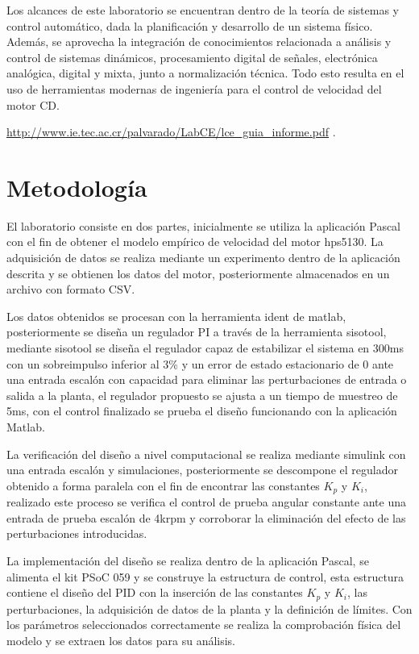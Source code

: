 \documentclass[conference]{IEEEtran}
\begin{document}
Los alcances de este laboratorio se encuentran dentro de la teoría de sistemas y control automático, dada la planificación y desarrollo de un sistema físico. Además, se aprovecha la integración de conocimientos relacionada a análisis y control de sistemas dinámicos, procesamiento digital de señales, electrónica analógica, digital y mixta, junto a normalización técnica. Todo esto resulta en el uso de herramientas modernas de ingeniería para el control de velocidad del motor CD.

\underline{\url{http://www.ie.tec.ac.cr/palvarado/LabCE/lce_guia_informe.pdf}} \cite{Pablo2018}.
\section{Metodología}

El laboratorio consiste en dos partes, inicialmente se utiliza la aplicación Pascal con el fin de obtener el modelo empírico de velocidad del motor hps5130. La adquisición de datos se realiza mediante un experimento dentro de la aplicación descrita y se obtienen los datos del motor, posteriormente almacenados en un archivo con formato CSV.

Los datos obtenidos se procesan con la herramienta ident de matlab, posteriormente se diseña un regulador PI a través de la herramienta sisotool, mediante sisotool se diseña el regulador capaz de estabilizar el sistema en 300ms con un sobreimpulso inferior al 3\% y un error de estado estacionario de 0 ante una entrada escalón con capacidad para eliminar las perturbaciones de entrada o salida a la planta, el regulador propuesto se ajusta a un tiempo de muestreo de 5ms, con el control finalizado se prueba el diseño funcionando con la aplicación Matlab.

La verificación del diseño a nivel computacional se realiza mediante simulink con una entrada escalón y simulaciones, posteriormente se descompone el regulador obtenido a forma paralela con el fin de encontrar las constantes $K_p$ y $K_i$, realizado este proceso se verifica el control de prueba angular constante ante una entrada de prueba escalón de 4krpm y corroborar la eliminación del efecto de las perturbaciones introducidas.

La implementación del diseño se realiza dentro de la aplicación Pascal, se alimenta el kit PSoC 059 y se construye la estructura de control, esta estructura contiene el diseño del PID con la inserción de las constantes $K_p$ y $K_i$, las perturbaciones, la adquisición de datos de la planta y la definición de límites. Con los parámetros seleccionados correctamente se realiza la comprobación física del modelo y se extraen los datos para su análisis.
\end{document}
